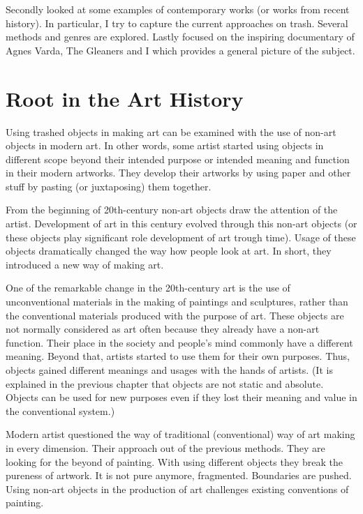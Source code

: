 Secondly looked at some examples of contemporary works (or works from recent history). In particular, I try to capture the current approaches on trash. Several methods and genres are explored.  Lastly focused on the inspiring documentary of Agnes Varda, The Gleaners and I which provides a general picture of the subject.





%
%
\section{Root in the Art History}
Using trashed objects in making art can be examined with the use of non-art objects in modern art. In other words, some artist started using objects in different scope beyond their intended purpose or intended meaning and function in their modern artworks. They develop their artworks by using paper and other stuff by pasting (or juxtaposing) them together. 


From the beginning of 20th-century non-art objects draw the attention of the artist. Development of art in this century evolved through this non-art objects (or these objects play significant role development of art trough time). Usage of these objects dramatically changed the way how people look at art. In short, they introduced a new way of making art.

One of the remarkable change in the 20th-century art is the use of unconventional materials in the making of paintings and sculptures, rather than the conventional materials produced with the purpose of art. These objects are not normally considered as art often because they already have a non-art function. Their place in the society and people's mind commonly have a different meaning. Beyond that, artists started to use them for their own purposes. Thus, objects gained different meanings and usages with the hands of artists. (It is explained in the previous chapter that objects are not static and absolute. Objects can be used for new purposes even if they lost their meaning and value in the conventional system.)

Modern artist questioned the way of traditional (conventional) way of art making in every dimension. Their approach out of the previous methods. They are looking for the beyond of painting. With using different objects they break the pureness of artwork. It is not pure anymore, fragmented. Boundaries are pushed. Using non-art objects in the production of art challenges existing conventions of painting. 

